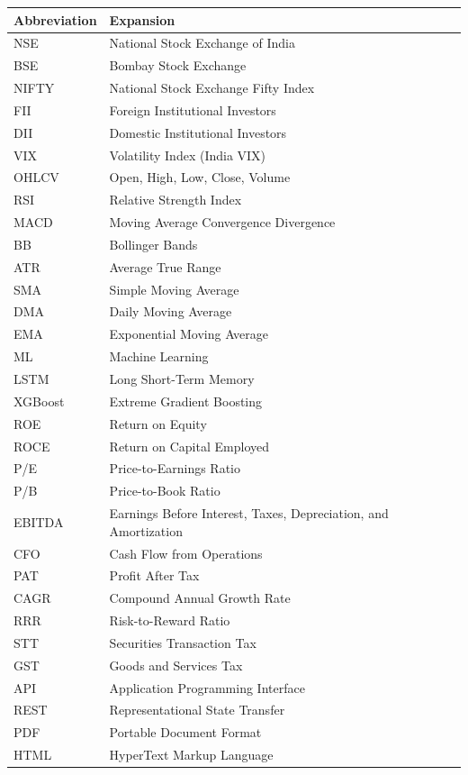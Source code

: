 \documentclass[12pt,a4paper]{report}
\begin{document}
\begin{longtable}{@{}p{3.5cm}p{12.5cm}@{}}
\toprule
\textbf{Abbreviation} & \textbf{Expansion} \\
\midrule
\endhead
NSE & National Stock Exchange of India \\
BSE & Bombay Stock Exchange \\
NIFTY & National Stock Exchange Fifty Index \\
FII & Foreign Institutional Investors \\
DII & Domestic Institutional Investors \\
VIX & Volatility Index (India VIX) \\
OHLCV & Open, High, Low, Close, Volume \\
RSI & Relative Strength Index \\
MACD & Moving Average Convergence Divergence \\
BB & Bollinger Bands \\
ATR & Average True Range \\
SMA & Simple Moving Average \\
DMA & Daily Moving Average \\
EMA & Exponential Moving Average \\
ML & Machine Learning \\
LSTM & Long Short-Term Memory \\
XGBoost & Extreme Gradient Boosting \\
ROE & Return on Equity \\
ROCE & Return on Capital Employed \\
P/E & Price-to-Earnings Ratio \\
P/B & Price-to-Book Ratio \\
EBITDA & Earnings Before Interest, Taxes, Depreciation, and Amortization \\
CFO & Cash Flow from Operations \\
PAT & Profit After Tax \\
CAGR & Compound Annual Growth Rate \\
RRR & Risk-to-Reward Ratio \\
STT & Securities Transaction Tax \\
GST & Goods and Services Tax \\
API & Application Programming Interface \\
REST & Representational State Transfer \\
PDF & Portable Document Format \\
HTML & HyperText Markup Language \\

\end{longtable}
\end{document}
